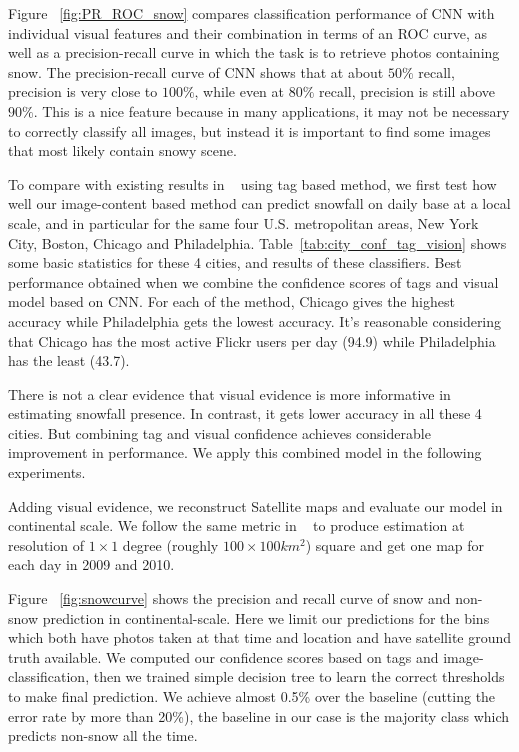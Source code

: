 Figure ~\ref{fig:PR_ROC_snow} compares classification performance of CNN with 
individual visual features and their combination in terms of an ROC curve, 
as well as a precision-recall curve in which the task is to retrieve photos containing snow.
The precision-recall curve of CNN shows that at about $50\%$ recall, precision is very close to $100\%$, 
while even at $80\%$ recall, precision is still above $90\%$. This is a nice feature because 
in many applications, it may not be necessary to correctly 
classify all images, but instead it is important to find some images that most likely contain snowy 
scene.


To compare with existing results in ~\cite{wang2013observing} using tag based method,
we first test how well our image-content based method can predict snowfall on daily base at a local scale, 
and in particular 
for the same four U.S. metropolitan areas, New York City, Boston, Chicago and Philadelphia. 
Table~\ref{tab:city_conf_tag_vision} 
shows some basic statistics for these 4 cities, and results of these classifiers. 
Best performance obtained when we combine 
the confidence scores of tags and visual model based on CNN. For each of the method, 
Chicago gives the highest accuracy while Philadelphia gets the lowest accuracy. 
It's reasonable considering that Chicago has the most active Flickr users per
day (94.9) while Philadelphia has the least (43.7). 

There is not a clear evidence that visual evidence is more informative in estimating snowfall 
presence. In contrast, it gets lower accuracy in all these 4 cities. But combining tag and visual 
confidence achieves considerable improvement in performance. We apply this combined model 
in the following experiments.

Adding visual evidence, we reconstruct Satellite maps and 
evaluate our model in continental scale. We follow the same metric in ~\cite{ecology2012www} to produce 
estimation at resolution of $1 \times 1$ degree (roughly $100 \times 100 km^2$) square and get one map for 
each day in 2009 and 2010.

Figure ~\ref{fig:snowcurve} shows the precision and recall curve of snow and non-snow prediction in 
continental-scale.
Here we limit our predictions for the bins which both have photos taken at that 
time and location and have satellite ground truth available.
We computed our confidence scores based on tags and image-classification, then we trained 
simple decision tree to learn the correct thresholds to make final prediction. We achieve 
almost 0.5\% over the baseline (cutting the error rate by more than 20\%), the baseline in 
our case is the majority class which predicts non-snow all the time. 




